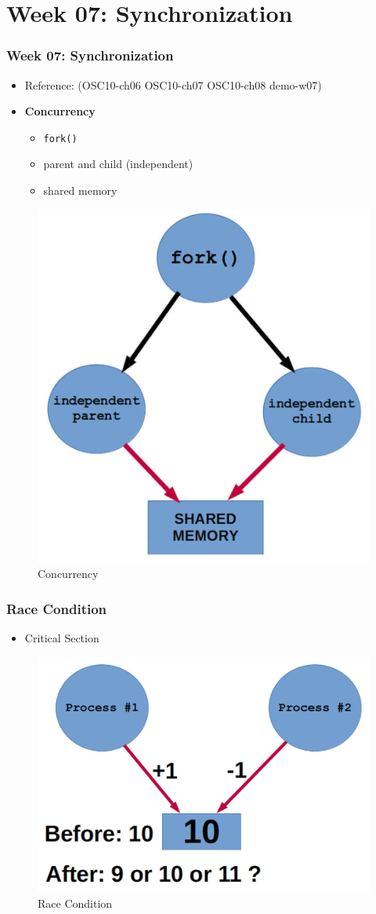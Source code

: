 \documentclass[aspectratio=169, xcolor=table, notheorems, hyperref={pdfpagelabels=false}]{beamer}
\begin{document}

\section{Week 07: Synchronization}
\begin{frame}[fragile]
\frametitle{Week 07: Synchronization}

\begin{itemize}
\item Reference: (OSC10-ch06 OSC10-ch07 OSC10-ch08 demo-w07)
\item \textbf{Concurrency}
\begin{itemize}
\item \texttt{fork()}
\item parent and child (independent)
\item shared memory
\end{itemize}
\end{itemize}

\begin{figure}
\includegraphics[width=0.28\linewidth]{os-concurrecy}
\caption{Concurrency}
\end{figure}

\end{frame}


\begin{frame}[fragile]
\frametitle{Race Condition}

\begin{itemize}
\item Critical Section
\end{itemize}

\begin{figure}
\includegraphics[width=0.56\linewidth]{os-critical}
\caption{Race Condition}
\end{figure}

\end{frame}
\end{document}
